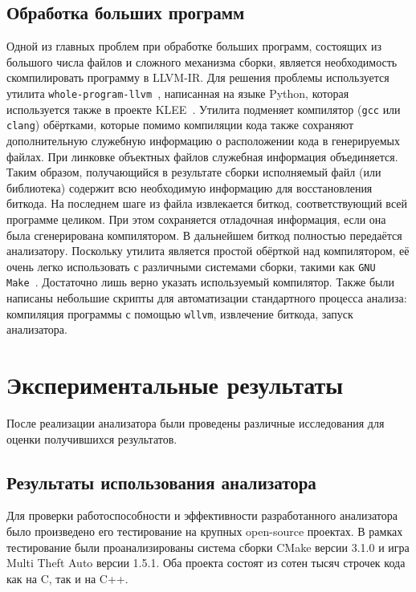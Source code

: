 \subsection{Обработка больших программ}

Одной из главных проблем при обработке больших программ, состоящих из
большого числа файлов и сложного механизма сборки, является
необходимость скомпилировать программу в LLVM-IR. Для решения проблемы
используется утилита \texttt{whole-program-llvm}~\cite{wllvm},
написанная на языке Python, которая используется также в проекте
KLEE~\cite{cadar2008klee}. Утилита подменяет компилятор (\texttt{gcc}
или \texttt{clang}) обёртками, которые помимо компиляции кода также
сохраняют дополнительную служебную информацию о расположении кода в
генерируемых файлах. При линковке объектных файлов служебная
информация объединяется. Таким образом, получающийся в результате
сборки исполняемый файл (или библиотека) содержит всю необходимую
информацию для восстановления биткода. На последнем шаге из файла
извлекается биткод, соответствующий всей программе целиком. При этом
сохраняется отладочная информация, если она была сгенерирована
компилятором. В дальнейшем биткод полностью передаётся
анализатору. Поскольку утилита является простой обёрткой над
компилятором, её очень легко использовать с различными системами
сборки, такими как \texttt{GNU Make}~\cite{gnumake}. Достаточно лишь
верно указать используемый компилятор. Также были написаны небольшие
скрипты для автоматизации стандартного процесса анализа: компиляция
программы с помощью \texttt{wllvm}, извлечение биткода, запуск
анализатора.

\section{Экспериментальные результаты}

После реализации анализатора были проведены различные исследования для
оценки получившихся результатов.

\subsection{Результаты использования анализатора}

Для проверки работоспособности и эффективности разработанного
анализатора было произведено его тестирование на крупных open-source
проектах. В рамках тестирование были проанализированы система сборки
CMake версии 3.1.0 и игра Multi Theft Auto версии 1.5.1. Оба проекта
состоят из сотен тысяч строчек кода как на C, так и на C++.

